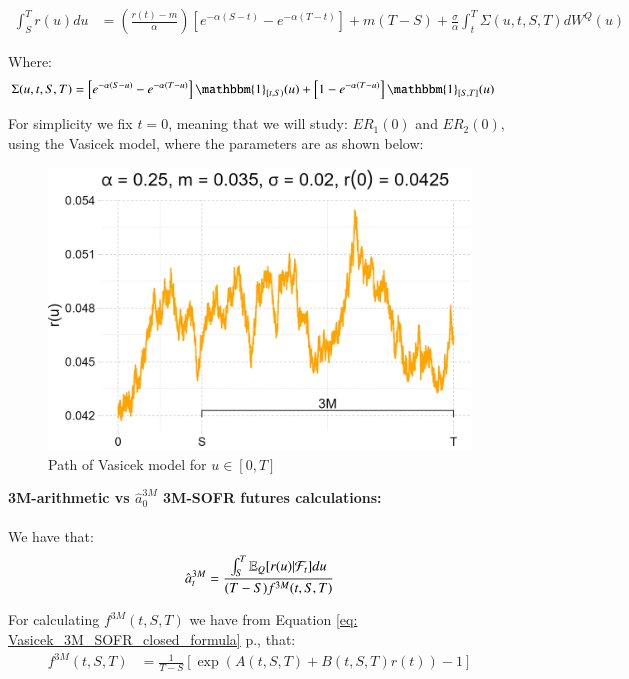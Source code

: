 \begin{align*}
\int_{S}^{T}r(u)du 
&= 
\left(
\frac{r(t)-m}{\alpha}
\right)
\left[
e^{-\alpha(S-t)} - e^{-\alpha(T-t)}
\right]
+ m(T-S) 
+ 
\frac{\sigma}{\alpha}\int_{t}^{T}\Sigma(u,t,S,T)dW^{Q}(u)
\end{align*}

Where: 
\begin{align*}
\Sigma(u,t,S,T) &= 
\left[
e^{-\alpha(S-u)}-e^{-\alpha(T-u)}
\right]\mathbbm{1}_{[t,S)}(u) 
+ 
\left[
1-e^{-\alpha(T-u)}
\right]\mathbbm{1}_{[S,T]}(u)
\end{align*}


For simplicity we fix $t=0$, meaning that we will study: 
$ER_{1}(0)$ and $ER_{2}(0)$, using the Vasicek model, where the parameters are as shown below:

\begin{figure}[htp]
    \centering
    \includegraphics[width=12cm]{figures/SOFR/Vasicek_path.png}
    \caption{Path of Vasicek model for $u\in [0,T]$}
    \label{fig: Vasicek_path}
\end{figure}

\newpage 
\textbf{3M-arithmetic vs $\hat{a}_{0}^{3M}$ 3M-SOFR futures calculations:}
\\~\\
We have that: 
\begin{align*}
\hat{a}_{t}^{3M} = \frac{
\int_{S}^{T}\mathbb{E}_{Q}[r(u)|\mathcal{F}_{t}]du
}{
(T-S)f^{3M}(t,S,T)
}    
\end{align*}

For calculating $f^{3M}(t,S,T)$ we have from 
Equation \ref{eq: Vasicek_3M_SOFR_closed_formula} p.\pageref{eq: Vasicek_3M_SOFR_closed_formula}, that:  
\begin{align*}
f^{3M}(t,S,T) &= 
\frac{1}{T-S}\left[
\exp\left(
A(t,S,T) + B(t,S,T)r(t)
\right)
-1
\right]
\end{align*}

